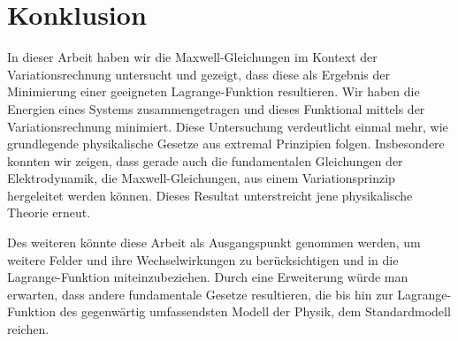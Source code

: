 %
%
%
%
\section{Konklusion}

In dieser Arbeit haben wir die Maxwell-Gleichungen im Kontext der Variationsrechnung untersucht und gezeigt, dass diese als Ergebnis der Minimierung einer geeigneten Lagrange-Funktion resultieren. Wir haben die Energien eines Systems zusammengetragen und dieses Funktional mittels der Variationsrechnung minimiert.
Diese Untersuchung verdeutlicht einmal mehr, wie grundlegende physikalische Gesetze aus extremal Prinzipien folgen. 
Insbesondere konnten wir zeigen, dass gerade auch die fundamentalen Gleichungen der Elektrodynamik, die Maxwell-Gleichungen, aus einem Variationsprinzip hergeleitet werden können. Dieses Resultat unterstreicht jene physikalische Theorie erneut. 

Des weiteren könnte diese Arbeit als Ausgangspunkt genommen werden, um weitere Felder und ihre Wechselwirkungen zu berücksichtigen und in die Lagrange-Funktion miteinzubeziehen. Durch eine Erweiterung würde man erwarten, dass andere fundamentale Gesetze resultieren, die bis hin zur Lagrange-Funktion des gegenwärtig umfassendsten Modell der Physik, dem Standardmodell reichen.
